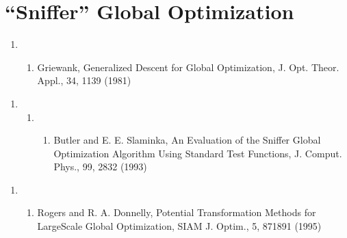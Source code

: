 \documentclass[letterpaper,11pt,english]{sphinxmanual}
\begin{document}
\section{“Sniffer” Global Optimization}
\label{\detokenize{text/references:sniffer-global-optimization}}\begin{enumerate}
%
\item {} \begin{enumerate}
%
\setcounter{enumii}{14}
\item {} 
Griewank, Generalized Descent for Global Optimization, J. Opt. Theor. Appl., 34, 11\sphinxhyphen{}39 (1981)

\end{enumerate}

\end{enumerate}
\begin{enumerate}
%
\setcounter{enumi}{17}
\item {} \begin{enumerate}
%
\item {} \begin{enumerate}
%
\setcounter{enumiii}{17}
\item {} 
Butler and E. E. Slaminka, An Evaluation of the Sniffer Global Optimization Algorithm Using Standard Test Functions, J. Comput. Phys., 99, 28\sphinxhyphen{}32 (1993)

\end{enumerate}

\end{enumerate}

\end{enumerate}
\begin{enumerate}
%
\setcounter{enumi}{9}
\item {} \begin{enumerate}
%
\setcounter{enumii}{22}
\item {} 
Rogers and R. A. Donnelly, Potential Transformation Methods for Large\sphinxhyphen{}Scale Global Optimization, SIAM J. Optim., 5, 871\sphinxhyphen{}891 (1995)

\end{enumerate}

\end{enumerate}
\end{document}
